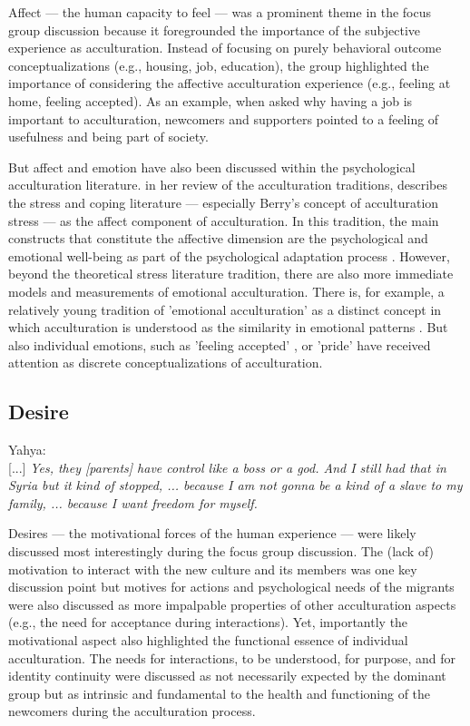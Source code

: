 \documentclass[man, 12pt, a4paper, mask]{apa7}
\begin{document}
Affect --- the human capacity to feel \citep[including emotions and moods;][]{FeldmanBarrett2007} --- was a prominent theme in the focus group discussion because it foregrounded the importance of the subjective experience as acculturation. Instead of focusing on purely behavioral outcome conceptualizations (e.g., housing, job, education), the group highlighted the importance of considering the affective acculturation experience (e.g., feeling at home, feeling accepted). As an example, when asked why having a job is important to acculturation, newcomers and supporters pointed to a feeling of usefulness and being part of society. 

But affect and emotion have also been discussed within the psychological acculturation literature. \citet{Ward2001} in her review of the acculturation traditions, describes the stress and coping literature --- especially Berry's concept of acculturation stress \citep{Berry1997b} --- as the affect component of acculturation. In this tradition, the main constructs that constitute the affective dimension are the psychological and emotional well-being as part of the psychological adaptation process \citep[including, for example, life satisfaction and depression;][]{Ward2019}. However, beyond the theoretical stress literature tradition, there are also more immediate models and measurements of emotional acculturation. There is, for example, a relatively young tradition of 'emotional acculturation' as a distinct concept in which acculturation is understood as the similarity in emotional patterns \citep[see][for a review]{DeLeersnyder2017}. But also individual emotions, such as 'feeling accepted' \citep{Jasini2018}, or 'pride' \citep{Suinn1995} have received attention as discrete conceptualizations of acculturation. 

\subsection{Desire}
\begin{displayquote}
    Yahya:\\
    {[...]} \textit{Yes, they [parents] have control like a boss or a god. And I still had that in Syria but it kind of stopped, ... because I am not gonna be a kind of a slave to my family, ... because I want freedom for myself.}
\end{displayquote}

Desires --- the motivational forces of the human experience --- were likely discussed most interestingly during the focus group discussion. The (lack of) motivation to interact with the new culture and its members was one key discussion point but motives for actions and psychological needs of the migrants were also discussed as more impalpable properties of other acculturation aspects (e.g., the need for acceptance during interactions). Yet, importantly the motivational aspect also highlighted the functional essence of individual acculturation. The needs for interactions, to be understood, for purpose, and for identity continuity were discussed as not necessarily expected by the dominant group but as intrinsic and fundamental to the health and functioning of the newcomers during the acculturation process.
\end{document}
